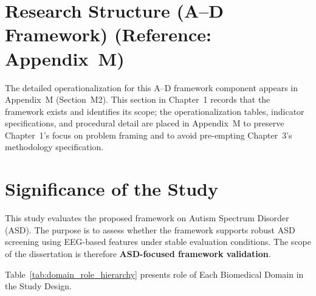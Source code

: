 \section{Research Structure (A--D Framework) (Reference: Appendix~M)}

\noindent The detailed operationalization for this A--D framework component appears in Appendix~M (Section~M2). This section in Chapter~1 records that the framework exists and identifies its scope; the operationalization tables, indicator specifications, and procedural detail are placed in Appendix~M to preserve Chapter~1's focus on problem framing and to avoid pre-empting Chapter~3's methodology specification.

\section{Significance of the Study}
\label{sec:scope}

This study evaluates the proposed framework on Autism Spectrum Disorder (ASD). The purpose is to assess whether the framework supports robust ASD screening using EEG-based features under stable evaluation conditions. The scope of the dissertation is therefore \textbf{ASD-focused framework validation}.


\iffalse %
\noindent Table~\ref{tab:domain_role_hierarchy} presents role of Each Biomedical Domain in the Study Design.

